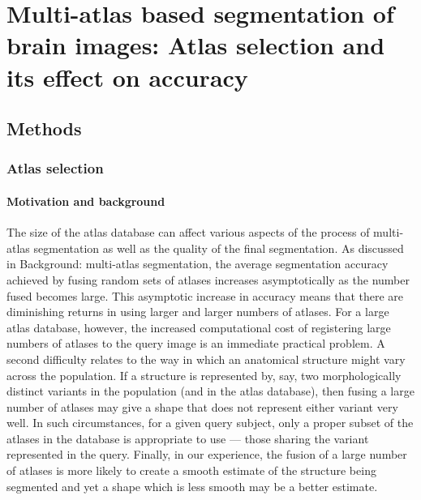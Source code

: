 
\chapter*{Multi-atlas based segmentation of brain images:
Atlas selection and its effect on accuracy}
\section*{Methods}
\subsection*{Atlas selection}
\subsubsection*{Motivation and background}
The size of the atlas database can affect
various aspects of the process of multi-atlas segmentation
as well as the quality of the final segmentation.
As discussed in Background: multi-atlas segmentation,
the average segmentation accuracy 
achieved by fusing random sets of atlases increases asymptotically
as the number fused becomes large.
This asymptotic increase in accuracy means that
there are diminishing returns in using larger and larger numbers of atlases.
For a large atlas database, however,
the increased computational cost of registering
large numbers of atlases to the query image is an immediate practical problem.
A second difficulty relates to the way
in which an anatomical structure might vary across the population.
If a structure is represented by, say,
two morphologically distinct variants in the population
(and in the atlas database),
then fusing a large number of atlases may give a shape
that does not represent either variant very well.
In such circumstances, for a given query subject,
only a proper subset of the atlases in the database is appropriate to use
— those sharing the variant represented in the query.
Finally, in our experience,
the fusion of a large number of atlases
is more likely to create a smooth estimate of the structure
being segmented and yet a shape which is less smooth may be a better estimate.


